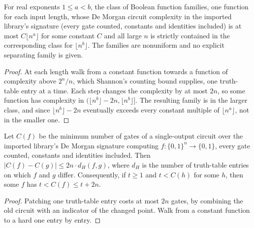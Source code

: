 \begin{theorem}
  \label{thm:lowerbounds-algebraic-hierarchy}
  \leanok
  For real exponents $1 \le a < b$, the class of Boolean function families,
  one function for each input length, whose De Morgan circuit complexity in
  the imported library's signature (every gate counted, constants and
  identities included) is at most $C \lfloor n^a \rfloor$ for some constant $C$
  and all large $n$ is strictly contained in the corresponding class for
  $\lfloor n^b \rfloor$. The families are nonuniform and no explicit separating
  family is given.
\end{theorem}
\begin{proof}
  \leanok
  At each length walk from a constant function towards a function of
  complexity above $2^n / n$, which Shannon's counting bound supplies, one
  truth-table entry at a time. Each step changes the complexity by at most
  $2n$, so some function has complexity in
  $(\lfloor n^b \rfloor - 2n, \lfloor n^b \rfloor]$. The resulting family is in
  the larger class, and since $\lfloor n^b \rfloor - 2n$ eventually exceeds
  every constant multiple of $\lfloor n^a \rfloor$, not in the smaller one.
\end{proof}

\begin{lemma}
  \label{lem:lowerbounds-algebraic-lipschitz}
  \leanok
  Let $C(f)$ be the minimum number of gates of a single-output circuit over the
  imported library's De Morgan signature computing $f : \{0,1\}^n \to \{0,1\}$,
  every gate counted, constants and identities included. Then
  $\lvert C(f) - C(g) \rvert \le 2n \cdot d_H(f, g)$, where $d_H$ is the
  number of truth-table entries on which $f$ and $g$ differ. Consequently, if
  $t \ge 1$ and $t < C(h)$ for some $h$, then some $f$ has
  $t < C(f) \le t + 2n$.
\end{lemma}
\begin{proof}
  \leanok
  Patching one truth-table entry costs at most $2n$ gates, by combining the old
  circuit with an indicator of the changed point. Walk from a constant function
  to a hard one entry by entry.
\end{proof}

